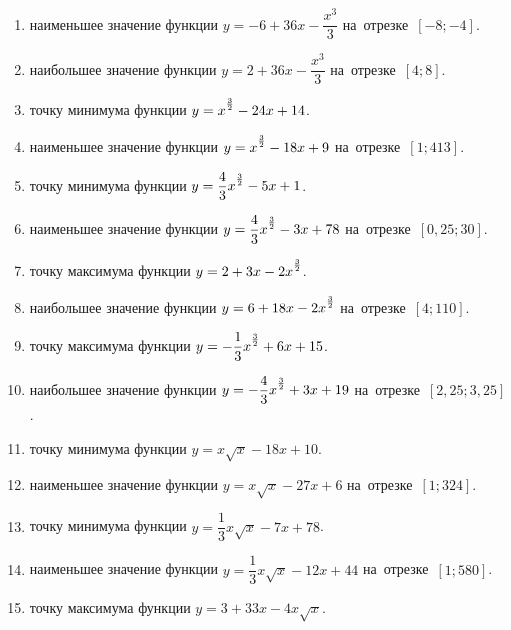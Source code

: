 \documentclass[a4paper,10pt]{article}
\begin{document}
\begin{enumerate}
\item {} наименьшее значение функции $y=-6 +36x-\dfrac{x^3}{3}$ на~отрезке~$\left[-8;-4\right]$.

\item {} наибольшее значение функции $y=2 +36x-\dfrac{x^3}{3}$ на~отрезке~$\left[4;8\right]$.

\item {} точку минимума функции $y=x\strut^{\frac{3}{2}} -24x+14$.

\item {} наименьшее значение функции $y=x\strut^{\frac{3}{2}} -18x+9$ на~отрезке~$\left[1;413\right]$.

\item {} точку минимума функции $y=\dfrac{4}{3}x\strut^{\frac{3}{2}} -5x+1$.

\item {} наименьшее значение функции $y=\dfrac{4}{3}x\strut^{\frac{3}{2}} -3x+78$ на~отрезке~$\left[0,25;30\right]$.

\item {} точку максимума функции $y=2+3x-2x\strut^{\frac{3}{2}}$.

\item {} наибольшее значение функции $y=6+18x-2x\strut^{\frac{3}{2}}$ на~отрезке~$\left[4;110\right]$.

\item {} точку максимума функции $y=-\dfrac{1}{3}x\strut^{\frac{3}{2}} +6x+15$.

\item {} наибольшее значение функции $y=-\dfrac{4}{3}x\strut^{\frac{3}{2}} +3x+19$ на~отрезке~$\left[2,25;3,25\right]$.

\item {} точку минимума функции $y=x\sqrt{x} -18x+10$.

\item {} наименьшее значение функции $y=x\sqrt{x} -27x+6$ на~отрезке~$\left[1;324\right]$.

\item {} точку минимума функции $y=\dfrac{1}{3}x\sqrt{x} -7x+78$.

\item {} наименьшее значение функции $y=\dfrac{1}{3}x\sqrt{x} -12x+44$ на~отрезке~$\left[1;580\right]$.

\item {} точку максимума функции $y=3+33x -4x\sqrt{x}$.


\end{enumerate}
\end{document}
